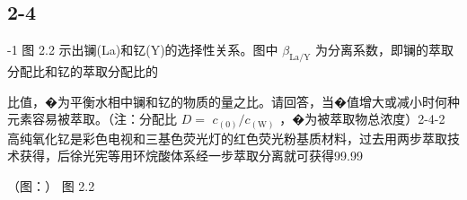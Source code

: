 \subsection*{2-4}
-1 图 2.2 ⽰出镧(La)和钇(Y)的选择性关系。图中 $\beta _ { \mathrm { L a / Y } }$ 为分离系数，即镧的萃取分配⽐和钇的萃取分配⽐的

⽐值，�为平衡⽔相中镧和钇的物质的量之⽐。请回答，当�值增⼤或减⼩时何种元素容易被萃取。（注：分配⽐ $D =$ $c _ { ( 0 ) } / c _ { ( \mathrm { W } ) }$ ，�为被萃取物总浓度）2-4-2 ⾼纯氧化钇是彩⾊电视和三基⾊荧光灯的红⾊荧光粉基质材料，过去⽤两步萃取技术获得，后徐光宪等⽤环烷酸体系经⼀步萃取分离就可获得99.99%

（图：）
图 2.2
